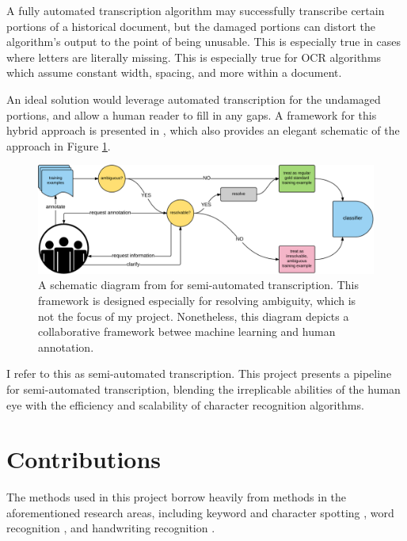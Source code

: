 \documentclass[final]{ukthesis}
\begin{document}
A fully automated transcription algorithm may successfully transcribe certain portions of a historical document, but the damaged portions can distort the algorithm's output to the point of being unusable. This is especially true in cases where letters are literally missing. This is especially true for OCR algorithms which assume constant width, spacing, and more within a document.

An ideal solution would leverage automated transcription for the undamaged portions, and allow a human reader to fill in any gaps. A framework for this hybrid approach is presented in \cite{schaekermann2016resolvable}, which also provides an elegant schematic of the approach in Figure \ref{fig:hcml-schematic}.


\begin{figure}[t]
\begin{center}
\includegraphics[width=14cm]{hcml-schematic}
\end{center}
\caption{A schematic diagram from \cite{schaekermann2016resolvable} for semi-automated transcription. This  framework is designed especially for resolving ambiguity, which is not the focus of my project. Nonetheless, this diagram depicts a collaborative framework betwee machine learning and human annotation.}
\label{fig:hcml-schematic}
\end{figure}

I refer to this as semi-automated transcription. This project presents a pipeline for semi-automated transcription, blending the irreplicable abilities of the human eye with the efficiency and scalability of character recognition algorithms.



%
%
\section{Contributions}
The methods used in this project borrow heavily from methods in the aforementioned research areas, including keyword and character spotting \cite{sharma2015adapting,frinken2012novel}, word recognition \cite{howe2009finding}, and handwriting recognition \cite{fischer2013fast,bluche2013feature}.
\end{document}
